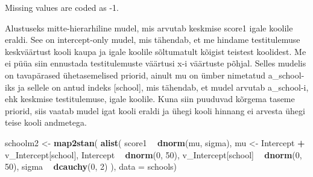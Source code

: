 \documentclass[]{book}
\newenvironment{Shaded}{\begin{snugshade}}{\end{snugshade}}
\newcommand{\CommentTok}[1]{\textcolor[rgb]{0.56,0.35,0.01}{\textit{#1}}}
\newcommand{\DataTypeTok}[1]{\textcolor[rgb]{0.13,0.29,0.53}{#1}}
\newcommand{\DecValTok}[1]{\textcolor[rgb]{0.00,0.00,0.81}{#1}}
\newcommand{\KeywordTok}[1]{\textcolor[rgb]{0.13,0.29,0.53}{\textbf{#1}}}
\newcommand{\NormalTok}[1]{#1}
\newcommand{\OperatorTok}[1]{\textcolor[rgb]{0.81,0.36,0.00}{\textbf{#1}}}
\newcommand{\StringTok}[1]{\textcolor[rgb]{0.31,0.60,0.02}{#1}}
\begin{document}
Missing values are coded as -1.

\begin{Shaded}
\end{Shaded}

Alustuseks mitte-hierarhiline mudel, mis arvutab keskmise score1 igale koolile eraldi. See on intercept-only mudel, mis tähendab, et me hindame testitulemuse keskväärtust kooli kaupa ja igale koolile sõltumatult kõigist teistest koolidest. Me ei püüa siin ennustada testitulemuste väärtusi x-i väärtuste põhjal. Selles mudelis on tavapärased ühetasemelised priorid, ainult mu on ümber nimetatud a\_school-iks ja sellele on antud indeks {[}school{]}, mis tähendab, et mudel arvutab a\_school-i, ehk keskmise testitulemuse, igale koolile. Kuna siin puuduvad kõrgema taseme priorid, siis vaatab mudel igat kooli eraldi ja ühegi kooli hinnang ei arvesta ühegi teise kooli andmetega.

\begin{Shaded}
\begin{Highlighting}[]
\NormalTok{schoolm2 <-}\StringTok{ }\KeywordTok{map2stan}\NormalTok{(}
  \KeywordTok{alist}\NormalTok{(}
\NormalTok{    score1 }\OperatorTok{~}\StringTok{ }\KeywordTok{dnorm}\NormalTok{(mu, sigma),}
\NormalTok{    mu <-}\StringTok{ }\NormalTok{Intercept }\OperatorTok{+}\StringTok{ }\NormalTok{v_Intercept[school],}
\NormalTok{    Intercept }\OperatorTok{~}\StringTok{ }\KeywordTok{dnorm}\NormalTok{(}\DecValTok{0}\NormalTok{, }\DecValTok{50}\NormalTok{),}
\NormalTok{    v_Intercept[school] }\OperatorTok{~}\StringTok{ }\KeywordTok{dnorm}\NormalTok{(}\DecValTok{0}\NormalTok{, }\DecValTok{50}\NormalTok{),}
\NormalTok{    sigma }\OperatorTok{~}\StringTok{ }\KeywordTok{dcauchy}\NormalTok{(}\DecValTok{0}\NormalTok{, }\DecValTok{2}\NormalTok{)}
\NormalTok{  ), }\DataTypeTok{data =}\NormalTok{ schools)}
\end{Highlighting}
\end{Shaded}
\end{document}
